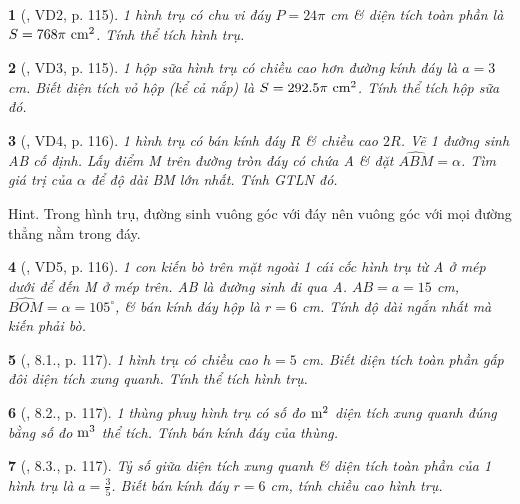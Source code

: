 \documentclass{article}
\newtheorem{baitoan}{}
\begin{document}
\begin{baitoan}[\cite{Binh_boi_duong_Toan_9_tap_2}, VD2, p. 115]
	1 hình trụ có chu vi đáy $P = 24\pi$ {\rm cm} \& diện tích toàn phần là $S = 768\pi\ {\rm cm}^2$. Tính thể tích hình trụ.
\end{baitoan}

\begin{baitoan}[\cite{Binh_boi_duong_Toan_9_tap_2}, VD3, p. 115]
	1 hộp sữa hình trụ có chiều cao hơn đường kính đáy là $a = 3$ {\rm cm}. Biết diện tích vỏ hộp (kể cả nắp) là $S = 292.5\pi\ {\rm cm}^2$. Tính thể tích hộp sữa đó.
\end{baitoan}

\begin{baitoan}[\cite{Binh_boi_duong_Toan_9_tap_2}, VD4, p. 116]
	1 hình trụ có bán kính đáy R \& chiều cao $2R$. Vẽ 1 đường sinh AB cố định. Lấy điểm M trên đường tròn đáy có chứa A \& đặt $\widehat{ABM} = \alpha$. Tìm giá trị của $\alpha$ để độ dài BM lớn nhất. Tính {\rm GTLN} đó.
\end{baitoan}
{\sf Hint.} Trong hình trụ, đường sinh vuông góc với đáy nên vuông góc với mọi đường thẳng nằm trong đáy.

\begin{baitoan}[\cite{Binh_boi_duong_Toan_9_tap_2}, VD5, p. 116]
	1 con kiến bò trên mặt ngoài 1 cái cốc hình trụ từ A ở mép dưới để đến M ở mép trên. AB là đường sinh đi qua A. $AB = a = 15$ {\rm cm}, $\widehat{BOM} = \alpha = 105^\circ$, \& bán kính đáy hộp là $r = 6$ {\rm cm}. Tính độ dài ngắn nhất mà kiến phải bò.
\end{baitoan}

\begin{baitoan}[\cite{Binh_boi_duong_Toan_9_tap_2}, 8.1., p. 117]
	1 hình trụ có chiều cao $h = 5$ {\rm cm}. Biết diện tích toàn phần gấp đôi diện tích xung quanh. Tính thể tích hình trụ.
\end{baitoan}

\begin{baitoan}[\cite{Binh_boi_duong_Toan_9_tap_2}, 8.2., p. 117]
	1 thùng phuy hình trụ có số đo $\rm m^2$ diện tích xung quanh đúng bằng số đo $\rm m^3$ thể tích. Tính bán kính đáy của thùng.
\end{baitoan}

\begin{baitoan}[\cite{Binh_boi_duong_Toan_9_tap_2}, 8.3., p. 117]
	Tỷ số giữa diện tích xung quanh \& diện tích toàn phần của 1 hình trụ là $a = \frac{3}{5}$. Biết bán kính đáy $r = 6$ {\rm cm}, tính chiều cao hình trụ.
\end{baitoan}
\end{document}
